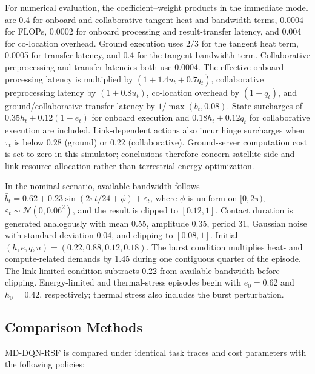 \documentclass[lettersize,journal]{IEEEtran}
\begin{document}
For numerical evaluation, the coefficient--weight products in the immediate model are 0.4 for onboard and collaborative tangent heat and bandwidth terms, 0.0004 for FLOPs, 0.0002 for onboard processing and result-transfer latency, and 0.004 for co-location overhead. Ground execution uses $2/3$ for the tangent heat term, 0.0005 for transfer latency, and 0.4 for the tangent bandwidth term. Collaborative preprocessing and transfer latencies both use 0.0004. The effective onboard processing latency is multiplied by $(1+1.4u_t+0.7q_t)$, collaborative preprocessing latency by $(1+0.8u_t)$, co-location overhead by $(1+q_t)$, and ground/collaborative transfer latency by $1/\max(b_t,0.08)$. State surcharges of $0.35h_t+0.12(1-e_t)$ for onboard execution and $0.18h_t+0.12q_t$ for collaborative execution are included. Link-dependent actions also incur hinge surcharges when $\tau_t$ is below 0.28 (ground) or 0.22 (collaborative). Ground-server computation cost is set to zero in this simulator; conclusions therefore concern satellite-side and link resource allocation rather than terrestrial energy optimization.

In the nominal scenario, available bandwidth follows $\bar b_t=0.62+0.23\sin(2\pi t/24+\phi)+\varepsilon_t$, where $\phi$ is uniform on $[0,2\pi)$, $\varepsilon_t\sim\mathcal N(0,0.06^2)$, and the result is clipped to $[0.12,1]$. Contact duration is generated analogously with mean 0.55, amplitude 0.35, period 31, Gaussian noise with standard deviation 0.04, and clipping to $[0.08,1]$. Initial $(h,e,q,u)=(0.22,0.88,0.12,0.18)$. The burst condition multiplies heat- and compute-related demands by 1.45 during one contiguous quarter of the episode. The link-limited condition subtracts 0.22 from available bandwidth before clipping. Energy-limited and thermal-stress episodes begin with $e_0=0.62$ and $h_0=0.42$, respectively; thermal stress also includes the burst perturbation.

\subsection{Comparison Methods}

MD-DQN-RSF is compared under identical task traces and cost parameters with the following policies:
\end{document}
